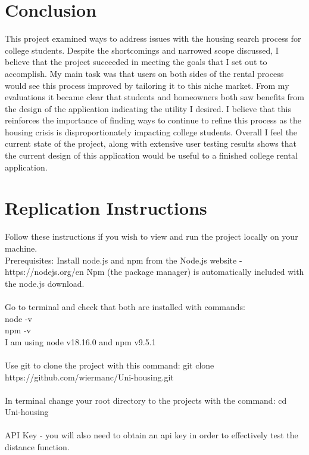 \documentclass[10pt,twocolumn]{article}
\begin{document}
\section{Conclusion}
This project examined ways to address issues with the housing search process for college students. Despite the shortcomings and narrowed scope discussed, I believe that the project succeeded in meeting the goals that I set out to accomplish. My main task was that users on both sides of the rental process would see this process improved by tailoring it to this niche market. From my evaluations it became clear that students and homeowners both saw benefits from the design of the application indicating the utility I desired. I believe that this reinforces the importance of finding ways to continue to refine this process as the housing crisis is disproportionately impacting college students. Overall I feel the current state of the project, along with extensive user testing results shows that the current design of this application would be useful to a finished college rental application. 


\newpage\appendix 
\section{Replication Instructions}
Follow these instructions if you wish to view and run the project locally on your machine. \\

\noindent Prerequisites:
Install node.js and npm from the Node.js website - https://nodejs.org/en
Npm (the package manager) is automatically included with the node.js download. \\
\\
Go to terminal and check that both are installed with commands:\\
node -v \\
npm -v \\

\noindent I am using node v18.16.0 and npm v9.5.1 \\
\\
Use git to clone the project with this command: git clone https://github.com/wiermanc/Uni-housing.git\\
\\
In terminal change your root directory to the projects with the command: cd Uni-housing \\
\\


API Key - you will also need to obtain an api key in order to effectively test the distance function. \\
\end{document}
